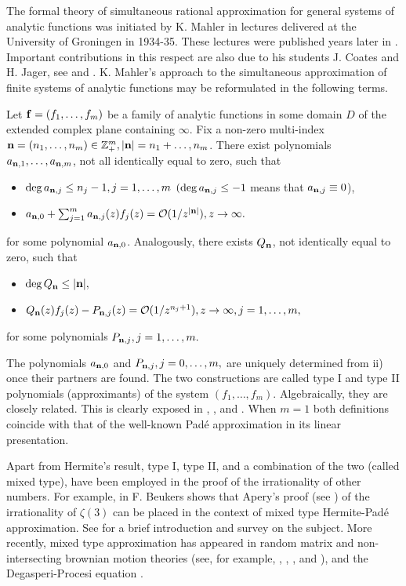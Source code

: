\documentclass{amsart}
\theoremstyle{definition}
\theoremstyle{remark}
\begin{document}
The formal theory of simultaneous rational approximation for general systems of analytic functions was initiated by K. Mahler in lectures delivered at the University of Groningen in 1934-35. These lectures were published years later in \cite{Mah}. Important contributions in this respect are also due to his students J. Coates and H. Jager, see \cite{Coa} and \cite{Jag}. K. Mahler's approach to the simultaneous approximation of finite systems of analytic functions may be reformulated in the following terms.

Let ${\bf f} = (f_1,\ldots,f_m)$ be a  family of analytic functions in some domain $D$ of the extended complex plane containing $\infty$. Fix a non-zero multi-index ${\bf n} = (n_1,\ldots,n_m) \in {\mathbb{Z}}_+^{m}, |{\bf n}| = n_1+\ldots,n_m$. There exist polynomials $a_{{\bf n},1}, \ldots, a_{{\bf n},m}$, not all identically equal to zero, such that
\begin{itemize}
\item[i)] $\deg a_{{\bf n},j} \leq n_j -1, j=1,\ldots,m$ $(\deg a_{{\bf n},j} \leq -1$ means that $a_{{\bf n},j} \equiv 0$),
\item[ii)]  $a_{{\bf n},0} +\sum_{j=1}^m a_{{\bf n},j}(z) f_j(z)  = {\mathcal{O}}(1/z^{|{\bf n}|}), z \to \infty.$
\end{itemize}
for some polynomial $a_{{\bf n},0}$. Analogously, there exists $Q_{\bf n}$, not identically equal to zero, such that
\begin{itemize}
\item[i)] $\deg Q_{{\bf n}} \leq |{\bf n}|,$
\item[ii)] $Q_{\bf n}(z)f_j(z) - P_{{\bf n},j}(z)= {\mathcal{O}}(1/z^{ n_j+1}), z \to \infty, j=1,\ldots,m,$
\end{itemize}
for some polynomials $P_{{\bf n},j}, j=1,\ldots,m.$

The polynomials $a_{{\bf n},0}$ and $P_{{\bf n},j},j=0,\ldots,m,$ are uniquely determined from ii) once their partners are found. The two constructions are called type I and type II polynomials (approximants) of the system $(f_1,\ldots,f_m)$. Algebraically, they are closely related. This is clearly exposed in \cite{Coa}, \cite{Jag}, and \cite{Mah}. When $m=1$ both definitions coincide with that of the well-known Pad\'{e} approximation in its linear presentation.

Apart from Hermite's result, type I, type II, and a combination of the two (called mixed type), have been employed in the proof of the irrationality of other numbers. For example, in \cite{Beu} F. Beukers shows that Apery's  proof (see \cite{Ape}) of the irrationality of $\zeta(3)$  can be placed in the context of mixed type Hermite-Pad\'{e} approximation. See \cite{Ass} for a brief introduction and survey on the subject. More recently, mixed type approximation has appeared in random matrix and non-intersecting brownian motion theories (see, for example, \cite{BleKui}, \cite{DK}, \cite{K1}, and \cite{K2}), and the Degasperi-Procesi equation \cite{Bertola:CBOPs}.
\end{document}

